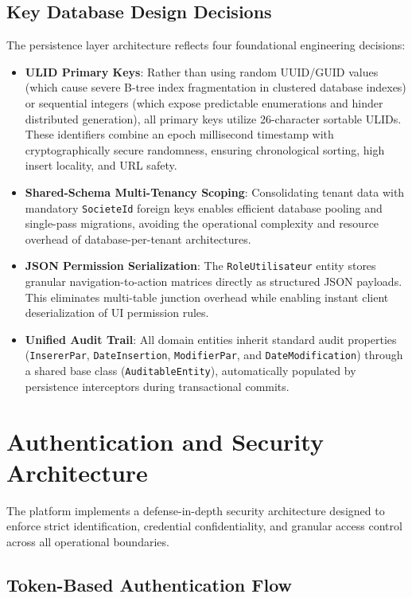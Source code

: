 \subsection{Key Database Design Decisions}
\label{sec:db_decisions}

The persistence layer architecture reflects four foundational engineering decisions:
\begin{itemize}
  \item \textbf{ULID Primary Keys}: Rather than using random UUID/GUID values (which cause severe B-tree index fragmentation in clustered database indexes) or sequential integers (which expose predictable enumerations and hinder distributed generation), all primary keys utilize 26-character sortable ULIDs. These identifiers combine an epoch millisecond timestamp with cryptographically secure randomness, ensuring chronological sorting, high insert locality, and URL safety.
  \item \textbf{Shared-Schema Multi-Tenancy Scoping}: Consolidating tenant data with mandatory \texttt{SocieteId} foreign keys enables efficient database pooling and single-pass migrations, avoiding the operational complexity and resource overhead of database-per-tenant architectures.
  \item \textbf{JSON Permission Serialization}: The \texttt{RoleUtilisateur} entity stores granular navigation-to-action matrices directly as structured JSON payloads. This eliminates multi-table junction overhead while enabling instant client deserialization of UI permission rules.
  \item \textbf{Unified Audit Trail}: All domain entities inherit standard audit properties (\texttt{InsererPar}, \texttt{DateInsertion}, \texttt{ModifierPar}, and \texttt{DateModification}) through a shared base class (\texttt{AuditableEntity}), automatically populated by persistence interceptors during transactional commits.
\end{itemize}

\section{Authentication and Security Architecture}
\label{sec:auth_security}

The platform implements a defense-in-depth security architecture designed to enforce strict identification, credential confidentiality, and granular access control across all operational boundaries.

\subsection{Token-Based Authentication Flow}
\label{sec:jwt_flow}

